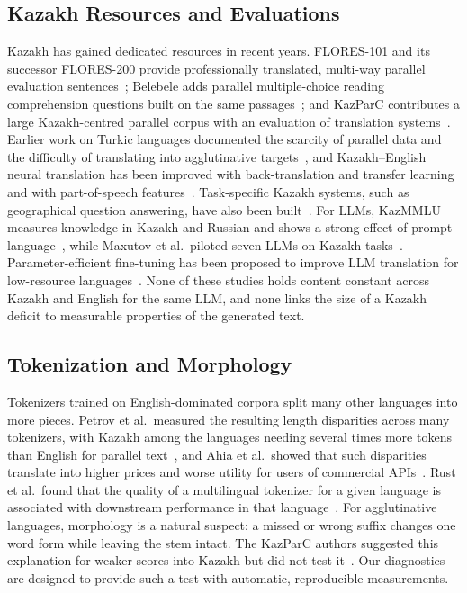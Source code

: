 \subsection{Kazakh Resources and Evaluations}
Kazakh has gained dedicated resources in recent years. FLORES-101 and its successor FLORES-200 provide professionally translated, multi-way parallel evaluation sentences~\cite{goyal2022flores,nllb2022}; Belebele adds parallel multiple-choice reading comprehension questions built on the same passages~\cite{bandarkar2024belebele}; and KazParC contributes a large Kazakh-centred parallel corpus with an evaluation of translation systems~\cite{yeshpanov2024kazparc}. Earlier work on Turkic languages documented the scarcity of parallel data and the difficulty of translating into agglutinative targets~\cite{mirzakhalov2021turkic}, and Kazakh--English neural translation has been improved with back-translation and transfer learning~\cite{karyukin2023nmt} and with part-of-speech features~\cite{yazar2025kazakh}. Task-specific Kazakh systems, such as geographical question answering, have also been built~\cite{mukanova2024geoqa}. For LLMs, KazMMLU measures knowledge in Kazakh and Russian and shows a strong effect of prompt language~\cite{togmanov2025kazmmlu}, while Maxutov et al.\ piloted seven LLMs on Kazakh tasks~\cite{maxutov2024kazakh}. Parameter-efficient fine-tuning has been proposed to improve LLM translation for low-resource languages~\cite{liang2025lsftl}. None of these studies holds content constant across Kazakh and English for the same LLM, and none links the size of a Kazakh deficit to measurable properties of the generated text.

\subsection{Tokenization and Morphology}
Tokenizers trained on English-dominated corpora split many other languages into more pieces. Petrov et al.\ measured the resulting length disparities across many tokenizers, with Kazakh among the languages needing several times more tokens than English for parallel text~\cite{petrov2023tokenizer}, and Ahia et al.\ showed that such disparities translate into higher prices and worse utility for users of commercial APIs~\cite{ahia2023cost}. Rust et al.\ found that the quality of a multilingual tokenizer for a given language is associated with downstream performance in that language~\cite{rust2021tokenizer}. For agglutinative languages, morphology is a natural suspect: a missed or wrong suffix changes one word form while leaving the stem intact. The KazParC authors suggested this explanation for weaker scores into Kazakh but did not test it~\cite{yeshpanov2024kazparc}. Our diagnostics are designed to provide such a test with automatic, reproducible measurements.

